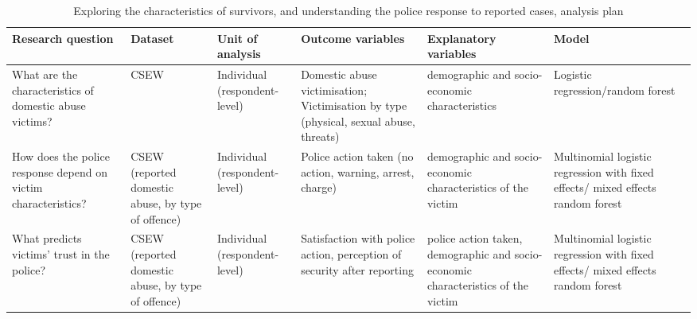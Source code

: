 \documentclass[11pt, a4paper]{article}
\begin{document}
\begin{table}[!htbp]
\caption{Exploring the characteristics of survivors, and understanding the police response to reported cases, analysis plan}
  \begin{threeparttable}[t]
  \centering
       \begin{tabular}{ L{2.8cm}  C{1.8cm}  C{1.8cm}  C{3.2cm}  C{2.8cm}  C{2cm} }
    \toprule
     \textbf{Research question} & \textbf{Dataset}    & \textbf{Unit of analysis} & \textbf{Outcome variables} & \textbf{Explanatory variables} & \textbf{Model} \\
    \midrule
    What are the characteristics of domestic abuse victims? & CSEW & Individual (respondent-level) & Domestic abuse victimisation; Victimisation by type (physical, sexual abuse, threats) & demographic and socio-economic characteristics & Logistic regression/random forest \\
        \midrule
    How does the police response depend on victim characteristics? & CSEW (reported domestic abuse, by type of offence) & Individual (respondent-level) & Police action taken (no action, warning, arrest, charge) & demographic and socio-economic characteristics of the victim & Multinomial logistic regression with  fixed effects/ mixed effects random forest \\
     \midrule
    What predicts victims' trust in the police? & CSEW (reported domestic abuse, by type of offence) & Individual (respondent-level)& Satisfaction with police action, perception of security after reporting & police action taken, demographic and socio-economic characteristics of the victim & Multinomial logistic regression with fixed effects/ mixed effects random forest \\
     \bottomrule
  \end{tabular}
    \end{threeparttable}%
  \label{tab:addlabel}%
\end{table}%
\end{document}
